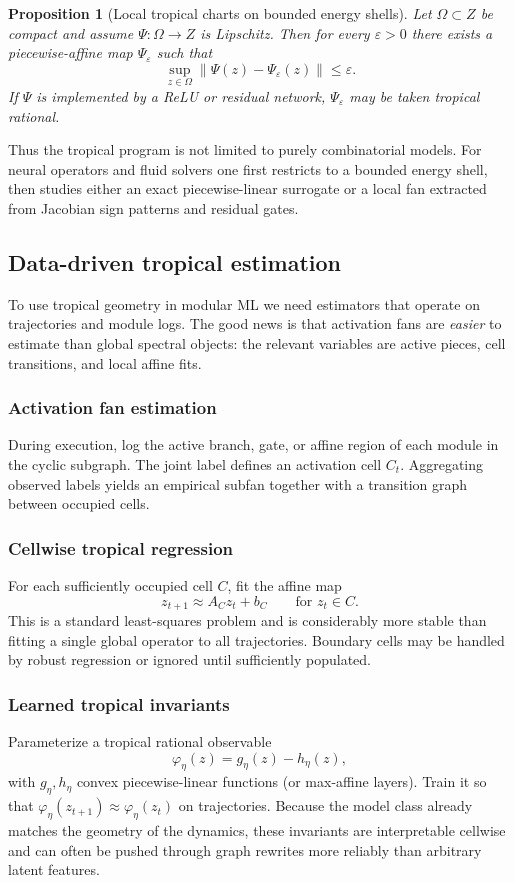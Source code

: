 \documentclass[11pt]{article}
\theoremstyle{definition}
\theoremstyle{plain}
\newtheorem{proposition}{Proposition}[section]
\theoremstyle{remark}
\newcommand{\norm}[1]{\left\lVert #1 \right\rVert}
\begin{document}
\begin{proposition}[Local tropical charts on bounded energy shells]
Let $\Omega\subset Z$ be compact and assume $\Psi:\Omega\to Z$ is Lipschitz.
Then for every $\varepsilon>0$ there exists a piecewise-affine map $\Psi_\varepsilon$ such that
\[
\sup_{z\in\Omega}\norm{\Psi(z)-\Psi_\varepsilon(z)}\le \varepsilon.
\]
If $\Psi$ is implemented by a ReLU or residual network, $\Psi_\varepsilon$ may be taken tropical rational.
\end{proposition}

Thus the tropical program is not limited to purely combinatorial models.
For neural operators and fluid solvers one first restricts to a bounded energy shell, then studies either an exact piecewise-linear surrogate or a local fan extracted from Jacobian sign patterns and residual gates.

\subsection{Data-driven tropical estimation}
To use tropical geometry in modular ML we need estimators that operate on trajectories and module logs.
The good news is that activation fans are \emph{easier} to estimate than global spectral objects:
the relevant variables are active pieces, cell transitions, and local affine fits.

\subsubsection{Activation fan estimation}
During execution, log the active branch, gate, or affine region of each module in the cyclic subgraph.
The joint label defines an activation cell $C_t$.
Aggregating observed labels yields an empirical subfan together with a transition graph between occupied cells.

\subsubsection{Cellwise tropical regression}
For each sufficiently occupied cell $C$, fit the affine map
\[
z_{t+1}\approx A_C z_t+b_C
\qquad\text{for } z_t\in C.
\]
This is a standard least-squares problem and is considerably more stable than fitting a single global operator to all trajectories.
Boundary cells may be handled by robust regression or ignored until sufficiently populated.

\subsubsection{Learned tropical invariants}
Parameterize a tropical rational observable
\[
\varphi_\eta(z)=g_\eta(z)-h_\eta(z),
\]
with $g_\eta,h_\eta$ convex piecewise-linear functions (or max-affine layers).
Train it so that $\varphi_\eta(z_{t+1})\approx \varphi_\eta(z_t)$ on trajectories.
Because the model class already matches the geometry of the dynamics, these invariants are interpretable cellwise and can often be pushed through graph rewrites more reliably than arbitrary latent features.
\end{document}
